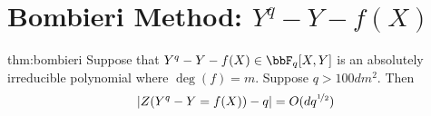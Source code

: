 \section{Bombieri Method: \texorpdfstring{$Y^q-Y-f(X)$}{Yq-Y-f(X)}}
\begin{Theorem}{}{thm:bombieri}
  Suppose that $Y^q-Y-f(X)\in\bbF_q[X,Y]$ is an absolutely irreducible polynomial where $\deg(f)=m$. Suppose $q>100dm^2$. Then $$|Z(Y^q-Y=f(X))-q|=O(dq^{\nicefrac12})$$
\end{Theorem}